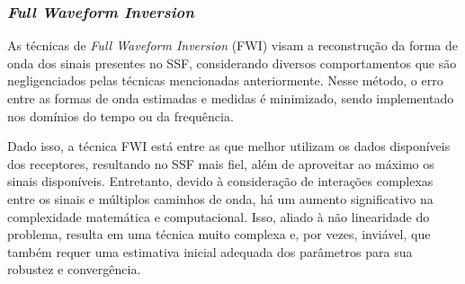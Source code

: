 \subsubsection{\textit{Full Waveform Inversion}}

As técnicas de \textit{Full Waveform Inversion} (FWI) \cite{virieux_overview_2009,fichtner_multiscale_2013} visam a reconstrução da forma de onda dos sinais presentes no SSF, considerando diversos comportamentos que são negligenciados pelas técnicas mencionadas anteriormente. Nesse método, o erro entre as formas de onda estimadas e medidas é minimizado, sendo implementado nos domínios do tempo ou da frequência.

Dado isso, a técnica FWI está entre as que melhor utilizam os dados disponíveis dos receptores, resultando no SSF mais fiel, além de aproveitar ao máximo os sinais disponíveis. Entretanto, devido à consideração de interações complexas entre os sinais e múltiplos caminhos de onda, há um aumento significativo na complexidade matemática e computacional. Isso, aliado à não linearidade do problema, resulta em uma técnica muito complexa e, por vezes, inviável, que também requer uma estimativa inicial adequada dos parâmetros para sua robustez e convergência.